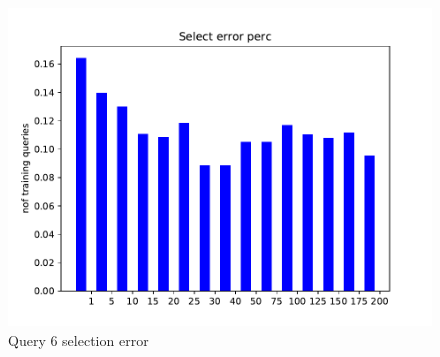 \documentclass{article}
\begin{document}
\begin{figure}[ht]
  \centering
  \includegraphics[scale=0.7]{figs/select_error_q6.pdf}
  \caption{Query 6 selection error}
  \label{fig:sel6}
\end{figure}
\end{document}

